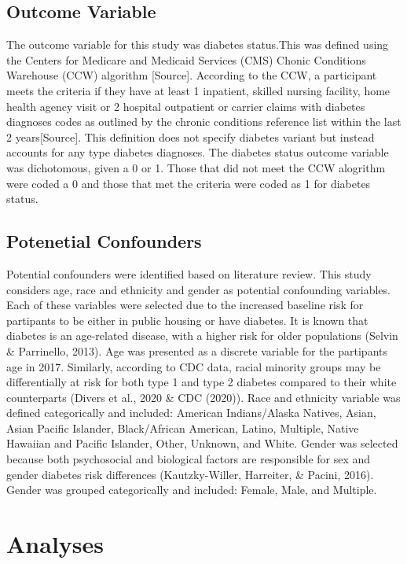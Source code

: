 \documentclass [11pt, proquest] {uwthesis}[2015/03/03]
\begin{document}
\subsection{Outcome Variable}\label{outcome-variable}

The outcome variable for this study was diabetes status.This was defined
using the Centers for Medicare and Medicaid Services (CMS) Chonic
Conditions Warehouse (CCW) algorithm {[}Source{]}. According to the CCW,
a participant meets the criteria if they have at least 1 inpatient,
skilled nursing facility, home health agency visit or 2 hospital
outpatient or carrier claims with diabetes diagnoses codes as outlined
by the chronic conditions reference list within the last 2
years{[}Source{]}. This definition does not specify diabetes variant but
instead accounts for any type diabetes diagnoses. The diabetes status
outcome variable was dichotomous, given a 0 or 1. Those that did not
meet the CCW alogrithm were coded a 0 and those that met the criteria
were coded as 1 for diabetes status.

\subsection{Potenetial Confounders}\label{potenetial-confounders}

Potential confounders were identified based on literature review. This
study considers age, race and ethnicity and gender as potential
confounding variables. Each of these variables were selected due to the
increased baseline risk for partipants to be either in public housing or
have diabetes. It is known that diabetes is an age-related disease, with
a higher risk for older populations (Selvin \& Parrinello, 2013). Age
was presented as a discrete variable for the partipants age in 2017.
Similarly, according to CDC data, racial minority groups may be
differentially at risk for both type 1 and type 2 diabetes compared to
their white counterparts (Divers et al., 2020 \& CDC (2020)). Race and
ethnicity variable was defined categorically and included: American
Indians/Alaska Natives, Asian, Asian Pacific Islander, Black/African
American, Latino, Multiple, Native Hawaiian and Pacific Islander, Other,
Unknown, and White. Gender was selected because both psychosocial and
biological factors are responsible for sex and gender diabetes risk
differences (Kautzky-Willer, Harreiter, \& Pacini, 2016). Gender was
grouped categorically and included: Female, Male, and Multiple.

\section{Analyses}\label{analyses}
\end{document}
